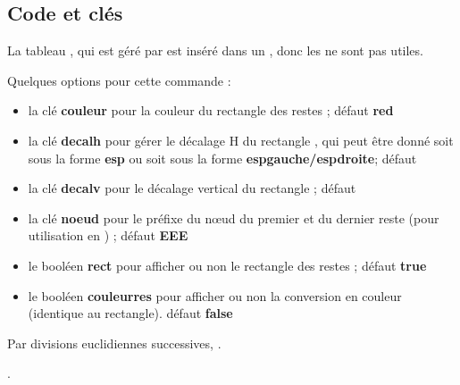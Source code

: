 \documentclass{article}
\newcommand\ctex[1]{\tcbox[vignettelatex]{#1}}
\newcommand\Cle[1]{{\bfseries\sffamily\textlangle #1\textrangle}}
\begin{document}
\subsection{Code et clés}

\begin{codetex}[]
\end{codetex}

\begin{codeinfo}
La \og tableau \fg, qui est géré par \ctex{array} est inséré dans un \ctex{ensuremath}, donc les \ctex{\$...\$} ne sont pas utiles.
\end{codeinfo}

\begin{codetex}
\end{codetex}

\begin{codecles}
Quelques options pour cette commande :

\begin{itemize}
	\item la clé \Cle{couleur} pour la couleur du \og rectangle \fg{} des restes ; \hfill{}défaut \Cle{red}
	\item la clé \Cle{decalh} pour gérer le décalage H du \og rectangle \fg{}, qui peut être donné soit sous la forme \Cle{esp} ou soit sous la forme \Cle{espgauche/espdroite}; \hfill{}défaut \Cle{2pt}
	\item la clé \Cle{decalv} pour le décalage vertical du \og rectangle \fg{} ; \hfill{}défaut \Cle{3pt}
	\item la clé \Cle{noeud} pour le préfixe du nœud du premier et du dernier reste (pour utilisation en \TikZ) ; \hfill{}défaut \Cle{EEE}
	\item le booléen \Cle{rect} pour afficher ou non le \og rectangle \fg{} des restes ; \hfill{}défaut \Cle{true}
	\item le booléen \Cle{couleurres} pour afficher ou non la conversion en couleur (identique au rectangle). \hfill{}défaut \Cle{false}
\end{itemize}
\end{codecles}

\begin{codetex}

Par divisions euclidiennes successives, .


.
\end{codetex}
\end{document}
